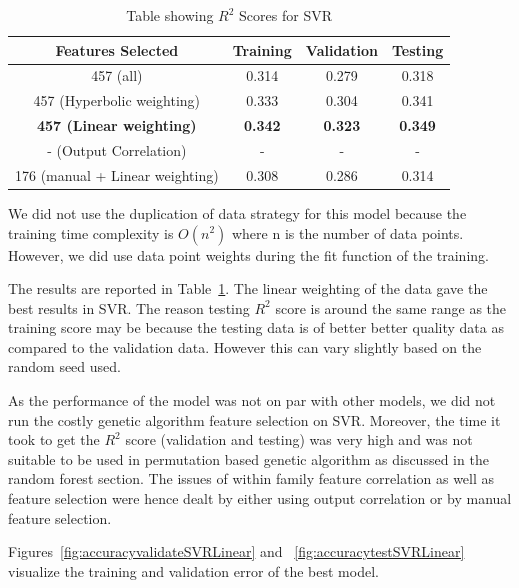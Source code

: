 \documentclass[11pt]{article}
\begin{document}
\begin{table} [h!]
\centering
 \begin{tabular}{ | c | c | c | c | }
\hline
\textbf{Features Selected} & \textbf{Training} & \textbf{Validation} &  \textbf{Testing} \\ [0.5 ex]
\hline \hline
457 (all) & 0.314 & 0.279 & 0.318\\
457 (Hyperbolic weighting) & 0.333 & 0.304 & 0.341\\
\textbf{457 (Linear weighting)} & \textbf{0.342} &\textbf{0.323} & \textbf{0.349}\\
- (Output Correlation)\footnotemark[1] & - & -  & - \\ 
176 (manual + Linear weighting) & 0.308  & 0.286  & 0.314\\ [1ex]
\hline
\end{tabular}
\caption{Table showing  $R^2$ Scores for SVR}
\label {table:2}
\end{table}

We did not use the duplication of data strategy for this model because the training time complexity is $O(n^2)$ where n is the number of data points.
However,  we did use data point weights during the fit function of the training.

The results are reported in Table~\ref{table:2}.
The linear weighting of the data gave the best results in SVR.
The reason testing $R^2$ score is around the same range as the training score may be because the testing data is of better better quality data as compared to the validation data.
However this can vary slightly based on the random seed used.

As the performance of the model was not on par with other models,
we did not run the costly genetic algorithm feature selection on SVR.
Moreover,  the time it took to get the $R^2$ score (validation and testing) was very high and was not suitable to be used in permutation based genetic algorithm as discussed in the random forest section.
The issues of within family feature correlation as well as feature selection were hence dealt by either using output correlation or by manual feature selection.

Figures~\ref{fig:accuracyvalidateSVRLinear} and ~\ref{fig:accuracytestSVRLinear} visualize the training and validation error of the best model.
\end{document}
